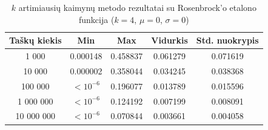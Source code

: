 \begin{table}[H]
    \centering
    \begin{tabular}{|c|c|c|c|c|}
        \hline
        \textbf{Taškų kiekis} & \textbf{Min} & \textbf{Max} & \textbf{Vidurkis} & \textbf{Std. nuokrypis} \\ \hline
        1 000        & 0.000148 & 0.458837 & 0.061279 & 0.071619 \\ \hline
        10 000       & 0.000002 & 0.358044 & 0.034245 & 0.038368 \\ \hline
        100 000      & $<10^{-6}$ & 0.196077 & 0.013789 & 0.015596 \\ \hline
        1 000 000    & $<10^{-6}$ & 0.124192 & 0.007199 & 0.008091 \\ \hline
        10 000 000   & $<10^{-6}$ & 0.070844 & 0.003661 & 0.004058 \\ \hline
    \end{tabular}
    \caption{$k$ artimiausių kaimynų metodo rezultatai su Rosenbrock'o etalono funkcija ($k = 4$, $\mu = 0$, $\sigma = 0$)}
\end{table}